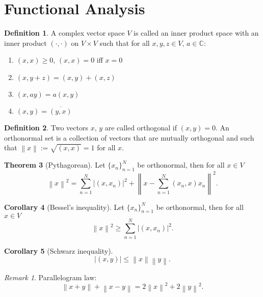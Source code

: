 \documentclass[twocolumn]{article}
\theoremstyle{definition}
\newtheorem{definition}{Definition}[section]
\newtheorem{theorem}[definition]{Theorem}
\newtheorem{corollary}[definition]{Corollary}
\theoremstyle{remark}
\newtheorem*{remark}{Remark}
\begin{document}
\section{Functional Analysis}

\begin{definition}
    A complex vector space $V$ is called an inner product space with an inner product
    $(\cdot, \cdot)$ on $V \times V$ such that for all $x, y, z \in V,\, a \in \mathbb{C}$:
    \begin{enumerate}[noitemsep]
        \item $(x, x) \geq 0$, $(x, x) = 0$ iff $x = 0$
        \item $(x, y + z) = (x, y) + (x, z)$
        \item $(x, ay) = a(x, y)$
        \item $(x, y) = \overline{(y, x)}$
    \end{enumerate}
\end{definition}
\begin{definition}
    Two vectors $x$, $y$ are called orthogonal if $(x, y) = 0$. An orthonormal set is a collection
    of vectors that are mutually orthogonal and such that $\left\lVert x \right\rVert := \sqrt{(x, x)} = 1$ for all $x$.
\end{definition}
\begin{theorem}[Pythagorean]
    Let $\{x_n \}_{n=1}^N$ be orthonormal, then for all $x \in V$
    \begin{equation}
        \left\lVert x\right\rVert^2 = \sum_{n=1}^N \left\lvert (x, x_n)\right\rvert^2 + \left\lVert x - \sum_{n=1}^N (x_n, x)x_n\right\rVert^2.
    \end{equation}
\end{theorem}
\begin{corollary}[Bessel's inequality]
    Let $\{x_n \}_{n=1}^N$ be orthonormal, then for all $x \in V$
    \begin{equation}
        \left\lVert x\right\rVert^2 \geq \sum_{n=1}^N \left\lvert (x, x_n)\right\rvert^2.
    \end{equation}
\end{corollary}
\begin{corollary}[Schwarz inequality]
    \begin{equation}
        \left\lvert (x, y)\right\rvert \leq \left\lVert x\right\rVert \left\lVert y\right\rVert.
    \end{equation}
\end{corollary}
\begin{remark}
    Parallelogram law:
    \begin{equation}
        \left\lVert x + y\right\rVert + \left\lVert x - y\right\rVert = 2 \left\lVert x\right\rVert ^2 + 2 \left\lVert y\right\rVert ^2.
    \end{equation}
\end{remark}
\end{document}
